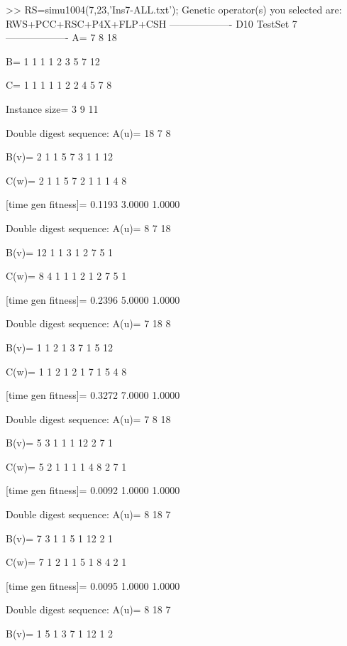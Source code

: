>> RS=simu1004(7,23,'Ins7-ALL.txt');
Genetic operator(s) you selected are:
RWS+PCC+RSC+P4X+FLP+CSH
------------------- D10 TestSet 7 -------------------
A=
     7     8    18

B=
     1     1     1     1     2     3     5     7    12

C=
     1     1     1     1     1     2     2     4     5     7     8

Instance size=
     3     9    11

Double digest sequence:
A(u)=
    18     7     8

B(v)=
     2     1     1     5     7     3     1     1    12

C(w)=
     2     1     1     5     7     2     1     1     1     4     8

[time gen fitness]=
    0.1193    3.0000    1.0000

Double digest sequence:
A(u)=
     8     7    18

B(v)=
    12     1     1     3     1     2     7     5     1

C(w)=
     8     4     1     1     1     2     1     2     7     5     1

[time gen fitness]=
    0.2396    5.0000    1.0000

Double digest sequence:
A(u)=
     7    18     8

B(v)=
     1     1     2     1     3     7     1     5    12

C(w)=
     1     1     2     1     2     1     7     1     5     4     8

[time gen fitness]=
    0.3272    7.0000    1.0000

Double digest sequence:
A(u)=
     7     8    18

B(v)=
     5     3     1     1     1    12     2     7     1

C(w)=
     5     2     1     1     1     1     4     8     2     7     1

[time gen fitness]=
    0.0092    1.0000    1.0000

Double digest sequence:
A(u)=
     8    18     7

B(v)=
     7     3     1     1     5     1    12     2     1

C(w)=
     7     1     2     1     1     5     1     8     4     2     1

[time gen fitness]=
    0.0095    1.0000    1.0000

Double digest sequence:
A(u)=
     8    18     7

B(v)=
     1     5     1     3     7     1    12     1     2

